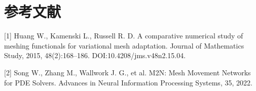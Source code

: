 \documentclass[UTF8,a4paper,zihao=5,fontset=fandol]{ctexart}
\begin{document}
\section*{参考文献}

\begin{sloppypar}[1] Huang W., Kamenski L., Russell R. D. A comparative numerical study of meshing functionals for variational mesh adaptation. Journal of Mathematics Study, 2015, 48(2):168–186. DOI:10.4208/jms.v48n2.15.04.\end{sloppypar}


\begin{sloppypar}[2] Song W., Zhang M., Wallwork J. G., et al. M2N: Mesh Movement Networks for PDE Solvers. Advances in Neural Information Processing Systems, 35, 2022.\end{sloppypar}
\end{document}
